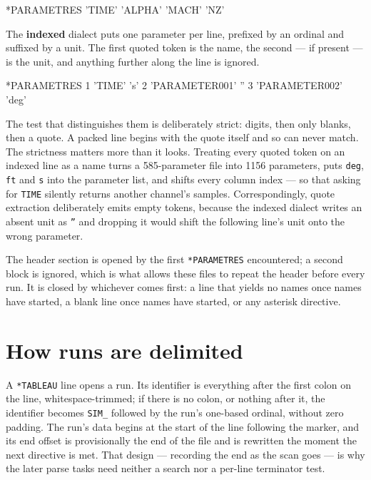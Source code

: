 \documentclass[11pt,a4paper,oneside]{report}
\newcommand{\code}[1]{\texttt{#1}}
\begin{document}
\begin{aoecode}
*PARAMETRES
 'TIME'   'ALPHA'   'MACH'   'NZ'
\end{aoecode}

The \textbf{indexed} dialect puts one parameter per line, prefixed by an ordinal
and suffixed by a unit. The first quoted token is the name, the second --- if
present --- is the unit, and anything further along the line is ignored.

\begin{aoecode}
*PARAMETRES
      1 'TIME' 's'
      2 'PARAMETER001'  ''
      3 'PARAMETER002'  'deg'
\end{aoecode}

The test that distinguishes them is deliberately strict: digits, then only
blanks, then a quote. A packed line begins with the quote itself and so can never
match. The strictness matters more than it looks. Treating every quoted token on
an indexed line as a name turns a 585-parameter file into 1156 parameters, puts
\code{deg}, \code{ft} and \code{s} into the parameter list, and shifts every
column index --- so that asking for \code{TIME} silently returns another
channel's samples. Correspondingly, quote extraction deliberately emits empty
tokens, because the indexed dialect writes an absent unit as \code{''} and
dropping it would shift the following line's unit onto the wrong parameter.

The header section is opened by the first \code{*PARAMETRES} encountered; a
second block is ignored, which is what allows these files to repeat the header
before every run. It is closed by whichever comes first: a line that yields no
names once names have started, a blank line once names have started, or any
asterisk directive.

\section{How runs are delimited}

A \code{*TABLEAU} line opens a run. Its identifier is everything after the first
colon on the line, whitespace-trimmed; if there is no colon, or nothing after it,
the identifier becomes \code{SIM\_} followed by the run's one-based ordinal,
without zero padding. The run's data begins at the start of the line following
the marker, and its end offset is provisionally the end of the file and is
rewritten the moment the next directive is met. That design --- recording the end
as the scan goes --- is why the later parse tasks need neither a search nor a
per-line terminator test.
\end{document}
